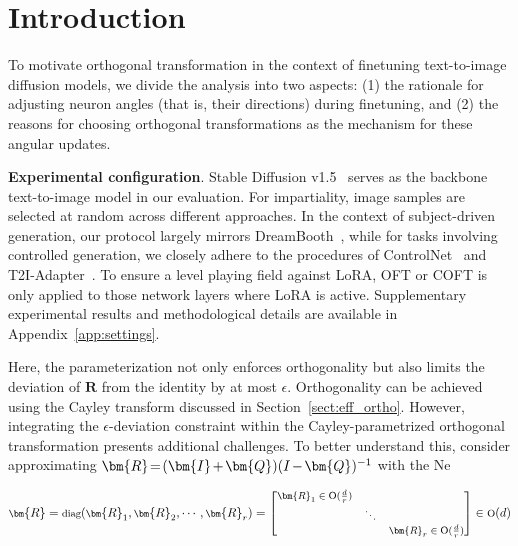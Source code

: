 \section{Introduction}

To motivate orthogonal transformation in the context of finetuning text-to-image diffusion models, we divide the analysis into two aspects: (1) the rationale for adjusting neuron angles (that is, their directions) during finetuning, and (2) the reasons for choosing orthogonal transformations as the mechanism for these angular updates.

\textbf{Experimental configuration}. Stable Diffusion v1.5~\cite{rombach2022high} serves as the backbone text-to-image model in our evaluation. For impartiality, image samples are selected at random across different approaches. In the context of subject-driven generation, our protocol largely mirrors DreamBooth~\cite{ruiz2023dreambooth}, while for tasks involving controlled generation, we closely adhere to the procedures of ControlNet~\cite{zhang2023adding} and T2I-Adapter~\cite{mou2023t2i}. To ensure a level playing field against LoRA, OFT or COFT is only applied to those network layers where LoRA is active. Supplementary experimental results and methodological details are available in Appendix~\ref{app:settings}.

Here, the parameterization not only enforces orthogonality but also limits the deviation of $\bm{R}$ from the identity by at most $\epsilon$. Orthogonality can be achieved using the Cayley transform discussed in Section~\ref{sect:eff_ortho}. However, integrating the $\epsilon$-deviation constraint within the Cayley-parametrized orthogonal transformation presents additional challenges. To better understand this, consider approximating $\thickmuskip=2mu \medmuskip=2mu \bm{R}=(\bm{I}+\bm{Q})(I-\bm{Q})^{-1}$ with the Ne

\begin{equation}
    \footnotesize
    \bm{R} = \text{diag}(\bm{R}_1, \bm{R}_2, \cdots, \bm{R}_r) = \begin{bmatrix}
    \bm{R}_1 \in \text{O}(\frac{d}{r}) &  &\\
    & \ddots & \\
    & & \bm{R}_r \in \text{O}(\frac{d}{r})
    \end{bmatrix} \in \text{O}(d)
\end{equation}

